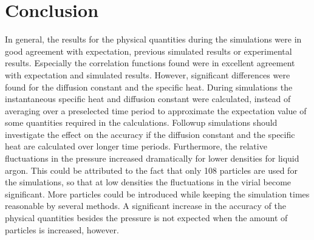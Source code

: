 \section{Conclusion}

In general, the results for the physical quantities during the simulations were in good agreement with expectation, previous simulated results or experimental results. Especially the correlation functions found were in excellent agreement with expectation and simulated results. However, significant differences were found for the diffusion constant and the specific heat. During simulations the instantaneous specific heat and diffusion constant were calculated, instead of averaging over a preselected time period to approximate the expectation value of some quantities required in the calculations. Followup simulations should investigate the effect on the accuracy if the diffusion constant and the specific heat are calculated over longer time periods. Furthermore, the relative fluctuations in the pressure increased dramatically for lower densities for liquid argon. This could be attributed to the fact that only 108 particles are used for the simulations, so that at low densities the fluctuations in the virial become significant. More particles could be introduced while keeping the simulation times reasonable by several methods\cite{PhysRev.159.98}\cite{thompson1983use}. A significant increase in the accuracy of the physical quantities besides the pressure is not expected when the amount of particles is increased, however.
